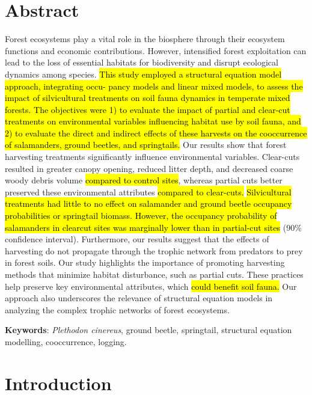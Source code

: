 \clearpage

\section*{Abstract}
\label{sec:abstract1}

Forest ecosystems play a vital role in the biosphere through their ecosystem functions and economic contributions. 
However, intensified forest exploitation can lead to the loss of essential habitats for biodiversity and disrupt ecological dynamics among species. 
\hl{This study employed a structural equation model approach, integrating occu- pancy models and linear mixed models, 
to assess the impact of silvicultural treatments on soil fauna dynamics in temperate mixed forests. 
The objectives were 1) to evaluate the impact of partial and clear-cut treatments on environmental variables influencing habitat use by soil fauna, 
and 2) to evaluate the direct and indirect effects of these harvests on the cooccurrence of salamanders, ground beetles, and springtails.}
Our results show that forest harvesting treatments significantly influence environmental variables. 
Clear-cuts resulted in greater canopy opening, reduced litter depth, and decreased coarse woody debris volume \hl{compared to control sites}, whereas partial cuts better preserved these environmental attributes \hl{compared to clear-cuts. }
\hl{Silvicultural treatments had little to no effect on salamander and ground beetle occupancy probabilities or springtail biomass. However, the occupancy probability of salamanders in clearcut sites was marginally lower than in partial-cut sites }(90\% confidence interval). 
Furthermore, our results suggest that the effects of harvesting do not propagate through the trophic network from predators to prey in forest soils. 
Our study highlights the importance of promoting harvesting methods that minimize habitat disturbance, such as partial cuts. 
These practices help preserve key environmental attributes, which \hl{could benefit soil fauna. }
Our approach also underscores the relevance of structural equation models in analyzing the complex trophic networks of forest ecosystems.

\textbf{Keywords}: \textit{Plethodon cinereus}, ground beetle, springtail, structural equation modelling, cooccurrence, logging.


\cleardoublepage

\section*{Introduction}
\label{sec:intro1}

